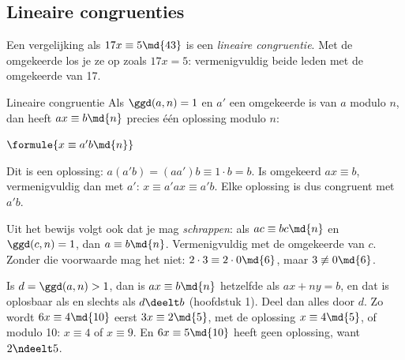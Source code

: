 \subsection{Lineaire congruenties}

Een vergelijking als $17x \equiv 5 \md{43}$ is een \emph{lineaire congruentie}. Met de omgekeerde los je ze op zoals $17x = 5$: vermenigvuldig beide leden met de omgekeerde van 17.

\begin{theorie}
\begin{stelling}{Lineaire congruentie}
Als $\ggd(a, n) = 1$ en $a'$ een omgekeerde is van $a$ modulo $n$, dan heeft $ax \equiv b \md{n}$ precies één oplossing modulo $n$:

\vspace{1mm}
\qquad $\formule{x \equiv a' b \md{n}}$
\end{stelling}

\begin{bewijs}
Dit is een oplossing: $a(a'b) = (aa')b \equiv 1 \cdot b = b$. Is omgekeerd $ax \equiv b$, vermenigvuldig dan met $a'$: $x \equiv a'ax \equiv a'b$. Elke oplossing is dus congruent met $a'b$.
\end{bewijs}
\end{theorie}

Uit het bewijs volgt ook dat je mag \textit{schrappen}: als $ac \equiv bc \md{n}$ en $\ggd(c, n) = 1$, dan $a \equiv b \md{n}$. Vermenigvuldig met de omgekeerde van $c$. Zonder die voorwaarde mag het niet: $2 \cdot 3 \equiv 2 \cdot 0 \md{6}$, maar $3 \not\equiv 0 \md{6}$.


Is $d = \ggd(a, n) > 1$, dan is $ax \equiv b \md{n}$ hetzelfde als $ax + ny = b$, en dat is oplosbaar als en slechts als $d \deelt b$ (hoofdstuk 1). Deel dan alles door $d$. Zo wordt $6x \equiv 4 \md{10}$ eerst $3x \equiv 2 \md{5}$, met de oplossing $x \equiv 4 \md{5}$, of modulo 10: $x \equiv 4$ of $x \equiv 9$. En $6x \equiv 5 \md{10}$ heeft geen oplossing, want $2 \ndeelt 5$.

